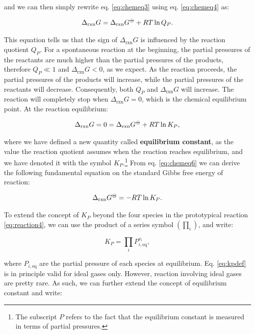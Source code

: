 \documentclass[
  9pt,
]{extbook}
\theoremstyle{definition}
\theoremstyle{definition}
\theoremstyle{definition}
\theoremstyle{definition}
\theoremstyle{remark}
\begin{document}
and we can then simply rewrite eq. \eqref{eq:chemeq3} using eq. \eqref{eq:chemeq4} as:

\begin{equation}
\Delta_{\text{rxn}} G = \Delta_{\text{rxn}} G^{-\kern-6pt{\ominus}\kern-6pt-}+ RT \ln Q_P.
\label{eq:chemeq5}
\end{equation}

This equation tells us that the sign of \(\Delta_{\text{rxn}} G\) is influenced by the reaction quotient \(Q_P\). For a spontaneous reaction at the beginning, the partial pressures of the reactants are much higher than the partial pressures of the products, therefore \(Q_P \ll 1\) and \(\Delta_{\text{rxn}} G < 0\), as we expect. As the reaction proceeds, the partial pressures of the products will increase, while the partial pressures of the reactants will decrease. Consequently, both \(Q_P\) and \(\Delta_{\text{rxn}} G\) will increase. The reaction will completely stop when \(\Delta_{\text{rxn}} G = 0\), which is the chemical equilibrium point. At the reaction equilibrium:

\begin{equation}
\Delta_{\text{rxn}} G = 0 = \Delta_{\text{rxn}} G^{-\kern-6pt{\ominus}\kern-6pt-}+ RT \ln K_P,
\label{eq:chemeq6}
\end{equation}

where we have defined a new quantity called \textbf{equilibrium constant}, as the value the reaction quotient assumes when the reaction reaches equilibrium, and we have denoted it with the symbol \(K_P\).\footnote{The subscript \(P\) refers to the fact that the equilibrium constant is measured in terms of partial pressures.} From eq. \eqref{eq:chemeq6} we can derive the following fundamental equation on the standard Gibbs free energy of reaction:

\begin{equation}
\Delta_{\text{rxn}} G^{-\kern-6pt{\ominus}\kern-6pt-}= - RT \ln K_P.
\label{eq:chemeqdg0}
\end{equation}

To extend the concept of \(K_P\) beyond the four species in the prototypical reaction \eqref{eq:reaction4}, we can use the product of a series symbol \(\left( \prod_i \right)\), and write:

\begin{equation}
K_P=\prod_i P_{i,\text{eq}}^{\nu_i},
\label{eq:kpdef}
\end{equation}

where \(P_{i,\text{eq}}\) are the partial pressure of each species at equilibrium. Eq. \eqref{eq:kpdef} is in principle valid for ideal gases only. However, reaction involving ideal gases are pretty rare. As such, we can further extend the concept of equilibrium constant and write:
\end{document}
